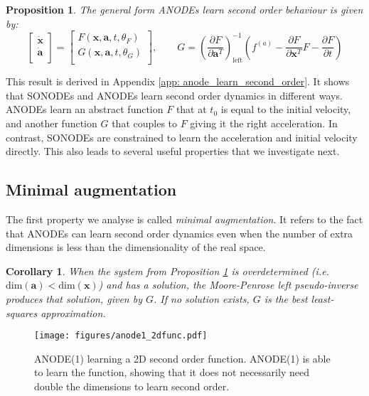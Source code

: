 \documentclass{article}
\newtheorem{corollary}{Corollary}[theorem]
\newtheorem{proposition}[theorem]{Proposition}
\theoremstyle{remark}
\theoremstyle{definition}
\begin{document}
\begin{proposition}
\label{prop: anode_general_form}
The general form ANODEs learn second order behaviour is given by:
\begin{equation}
\begin{bmatrix}
\dot{\mathbf{x}}\\
\dot{\mathbf{a}}\\
\end{bmatrix}
=
\begin{bmatrix}
F(\mathbf{x},\mathbf{a},t,\theta_{F})\\
G(\mathbf{x},\mathbf{a},t,\theta_{G})\\
\end{bmatrix},
\qquad
G = \left( \frac{\partial F}{\partial \mathbf{a}^{T}}\right)_{\text{left}}^{-1}
\left(
f^{(a)} - \frac{\partial F}{\partial \mathbf{x}^{T}}F - 
\frac{\partial F}{\partial t}
\right)
\end{equation}
\end{proposition}

This result is derived in Appendix \ref{app: anode_learn_second_order}. It shows that SONODEs and ANODEs learn second order dynamics in different ways. ANODEs learn an abstract function $F$ that at $t_0$ is equal to the initial velocity, and another function $G$ that couples to $F$ giving it the right acceleration. In contrast, SONODEs are constrained to learn the acceleration and initial velocity directly. This also leads to several useful properties that we investigate next. 

\subsection{Minimal augmentation}

The first property we analyse is called \textit{minimal augmentation}. It refers to the fact that ANODEs can learn second order dynamics even when the number of extra dimensions is less than the dimensionality of the real space.

\begin{corollary}
When the system from Proposition \ref{prop: anode_general_form} is overdetermined (i.e. $\text{dim}(\mathbf{a}) < \text{dim}(\mathbf{x})$) and has a solution, the Moore-Penrose left pseudo-inverse produces that solution, given by $G$. If no solution exists, $G$ is the best least-squares approximation.  
\end{corollary}

\begin{figure}[h]
    \centering
    \texttt{[image: figures/anode1\_2dfunc.pdf]}
    \vspace{-10pt}
    \caption{ANODE(1) learning a 2D second order function. ANODE(1) is able to learn the function, showing that it does not necessarily need double the dimensions to learn second order.}
    \label{fig: anode_1_2dfunc}
\end{figure}
\end{document}
